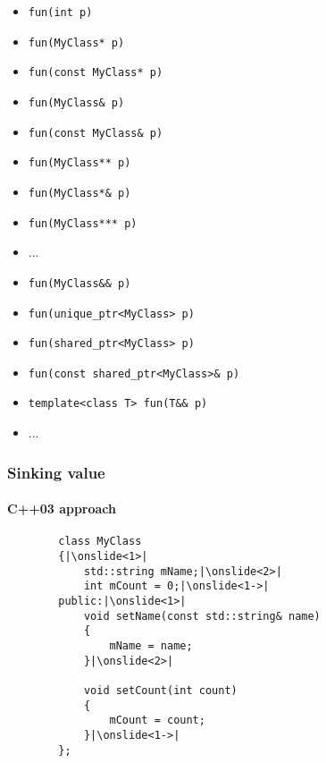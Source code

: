 \documentclass{beamer}
\begin{document}
\begin{frame}
    \begin{itemize}
			\item \texttt{fun(int p)}
			\item \texttt{fun(MyClass* p)}
			\item \texttt{fun(const MyClass* p)}
			\item \texttt{fun(MyClass\& p)}
			\item \texttt{fun(const MyClass\& p)}
			\item \texttt{fun(MyClass** p)}
			\item \texttt{fun(MyClass*\& p)}
			\item \texttt{fun(MyClass*** p)}
			\item ...
            \pause \newline
			\item \texttt{fun(MyClass\&\& p)}
			\item \texttt{fun(unique\_ptr<MyClass> p)}
			\item \texttt{fun(shared\_ptr<MyClass> p)}
			\item \texttt{fun(const shared\_ptr<MyClass>\& p)}
			\item \texttt{template<class T> fun(T\&\& p)}
			\item ...
    \end{itemize}
\end{frame}

\begin{frame}[fragile,t]
\frametitle{Sinking value}
\framesubtitle{C++03 approach}
	\begin{lstlisting}
        class MyClass
        {|\onslide<1>|
            std::string mName;|\onslide<2>|
            int mCount = 0;|\onslide<1->|
        public:|\onslide<1>|
            void setName(const std::string& name)
            {
                mName = name;
            }|\onslide<2>|
            
            void setCount(int count) 
            {
                mCount = count;
            }|\onslide<1->|
        };	
	\end{lstlisting}
	


\end{frame}
\end{document}
